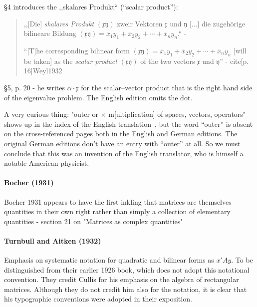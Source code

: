 \S 4 introduces the ,,skalares Produkt`` (``scalar product''):
\begin{quote}
,,[Die] \textit{skalares Produkt} $(\mathfrak x \mathfrak y)$ zweir Vektoren
$\mathfrak x$ und $\mathfrak y$ [...] die zugehörige bilineare Bildung
$(\mathfrak x \mathfrak y) = \overline x_1 y_1 + \overline x_2 y_2 + \cdots + \overline x_n y_n $.``
- \cite[p. 15]{Weyl1928}

``[T]he corresponding bilinear form
$(\mathfrak x \mathfrak y) = \overline x_1 y_1 + \overline x_2 y_2 + \cdots + \overline x_n y_n $
[will be taken] as the \textit{scalar product} $(\mathfrak x \mathfrak y)$ of the two vectors
$\mathfrak x$ und $\mathfrak y$'' - cite[p. 16]{Weyl1932}
\end{quote}

\S 5, p. 20 - he writes $\alpha \cdot \mathfrak x$ for the scalar--vector product
that is the right hand side of the eigenvalue problem. The English edition omits the dot.

A very curious thing: "outer or $\times$ m[ultiplication] of spaces, vectors, operators" shows up in the index of the English translation~\cite{Weyl1931}, but the word ``outer'' is absent on the cross-referenced pages both in the English and German editions. The original German editions don't have an entry with ``outer'' at all. So we must conclude that this was an invention of the English translator, who is himself a notable American physicist.



\paragraph{Bocher (1931)}

Bocher 1931 appears to have the first inkling that matrices are themselves quantities in their own right rather than simply a collection of elementary quantities - section 21 on "Matrices as complex quantities"




\paragraph{Turnbull and Aitken (1932)}

Emphasis on systematic notation for quadratic and bilinear forms as $x'Ay$.
To be distinguished from their earlier 1926 book, which does not adopt this notational convention.
They credit Cullis for his emphasis on the algebra of rectangular matrices. Although they do not credit him also for the notation, it is clear that his typographic conventions were adopted in their exposition.



